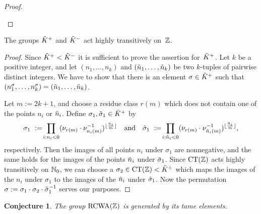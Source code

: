 \documentclass{amsart}
\theoremstyle{definition} \newtheorem{CTZDefinition}{Definition}[section]
\theoremstyle{plain}      \newtheorem{CTZPropertiesTheorem}[CTZDefinition]{Theorem}
\theoremstyle{plain}      \newtheorem{CTZSubgroupsTheorem}[CTZDefinition]{Theorem}
\theoremstyle{definition} \newtheorem{RcwaMappingDefinition}{Definition}[section]
\theoremstyle{definition} \newtheorem{RCWADefinition}[RcwaMappingDefinition]{Definition}
\theoremstyle{plain}      \newtheorem{CTZNotFinitelyGeneratedTheorem}
\theoremstyle{definition} \newtheorem{CTZSmEmbeddingDefinition}[RcwaMappingDefinition]{Definition}
\theoremstyle{plain}      \newtheorem{CTZHighlyTransitiveTheorem}[RcwaMappingDefinition]{Theorem}
\theoremstyle{plain}      \newtheorem{CTZTorsionElementsDivisibleTheorem}
\theoremstyle{plain}      \newtheorem{CTLemma}{Lemma}[section]
\theoremstyle{plain}      \newtheorem{IntegralCommutatorLemma}[CTLemma]{Lemma}
\theoremstyle{plain}      \newtheorem{NormalSubgroupContainsIntegralElementLemma}[CTLemma]{Lemma}
\theoremstyle{plain}      \newtheorem{CTZSimpleTheorem}[CTLemma]{Theorem}
\theoremstyle{remark}     \newtheorem{CTZSimpleRemark}[CTLemma]{Remark}
\theoremstyle{definition} \newtheorem{CTPZDefinition}[CTLemma]{Definition}
\theoremstyle{plain}      \newtheorem{CTPZSimpleCorollary}[CTLemma]{Corollary}
\theoremstyle{plain}      \newtheorem{CTPZSimpleProblem}[CTLemma]{Problem}
\theoremstyle{plain}      \newtheorem{FnPSL2ZEmbeddingTheorem}{Theorem}[section]
\theoremstyle{plain}      \newtheorem{FreeProductEmbeddingTheorem}[FnPSL2ZEmbeddingTheorem]{Theorem}
\theoremstyle{definition} \newtheorem{RestrictionMonomorphismDefinition}
\theoremstyle{plain}      \newtheorem{DirectAndWreathProductsEmbeddingTheorem}
\theoremstyle{plain}      \newtheorem{DirectAndWreathProductsEmbeddingCorollary}
\theoremstyle{definition} \newtheorem{CTintZDefinition}[FnPSL2ZEmbeddingTheorem]{Definition}
\theoremstyle{plain}      \newtheorem{CTintZSimpleTheorem}[FnPSL2ZEmbeddingTheorem]{Theorem}
\theoremstyle{definition} \newtheorem{KernelDefinition}{Definition}[section]
\theoremstyle{definition} \newtheorem{TameWildDefinition}[KernelDefinition]{Definition}
\theoremstyle{definition} \newtheorem{SimpleSupergroupsDefinition}[KernelDefinition]{Definition}
\theoremstyle{definition} \newtheorem{CSCRDefinition}[KernelDefinition]{Definition}
\theoremstyle{plain}      \newtheorem{SimpleSupergroupsGeneratorsTheorem}[KernelDefinition]{Theorem}
\theoremstyle{plain}      \newtheorem{SimpleSupergroupsTheorem}[KernelDefinition]{Theorem}
\theoremstyle{plain}      \newtheorem{SimpleSupergroupsTransitivityTheorem}
\theoremstyle{plain}      \newtheorem{TameGenerationConjecture}[KernelDefinition]{Conjecture}
\theoremstyle{remark}     \newtheorem{TameGenerationRemark}[KernelDefinition]{Remark}
\begin{document}
\begin{proof}
\begin{enumerate}
  \end{enumerate}
  \vspace{-5mm}
\end{proof}

\begin{SimpleSupergroupsTransitivityTheorem} \label{SimpleSupergroupsTransitivityTheorem}
  The groups \(\tilde{K}^+\) and \(\tilde{K}^-\) act highly transitively on~\(\mathbb{Z}\).
\end{SimpleSupergroupsTransitivityTheorem}
\begin{proof}
  Since \(\tilde{K}^+ < \tilde{K}^-\) it is sufficient to prove the assertion for~\(\tilde{K}^+\).
  Let \(k\) be a positive integer, and let \((n_1, \dots, n_k)\) and \((\tilde{n}_1, \dots, \tilde{n}_k)\)
  be two \(k\)-tuples of pairwise distinct integers.
  We have to show that there is an element \(\sigma \in \tilde{K}^+\) such that
  \((n_1^\sigma, \dots, n_k^\sigma) = (\tilde{n}_1, \dots, \tilde{n}_k)\).

  Let \(m := 2k+1\), and choose a residue class \(r(m)\) which does not contain one of the
  points \(n_i\) or \(\tilde{n}_i\). Define \(\sigma_1, \tilde{\sigma}_1 \in \tilde{K}^+\) by
  \[
    \sigma_1 \ := \!
    \prod_{i: n_i < 0} (\nu_{r(m)} \cdot \nu_{n_i(m)}^{-1})^{\lfloor \frac{n_i}{m} \rfloor}
    \ \ \ \text{and} \ \ \
    \tilde{\sigma}_1 \ := \!
    \prod_{i: \tilde{n}_i < 0}
    (\nu_{r(m)} \cdot \nu_{\tilde{n}_i(m)}^{-1})^{\lfloor \frac{\tilde{n}_i}{m} \rfloor},
  \]
  respectively.
  Then the images of all points \(n_i\) under \(\sigma_1\) are nonnegative,
  and the same holds for the images of the points \(\tilde{n}_i\) under \(\tilde{\sigma}_1\).
  Since \(\CT{\ZZ}\) acts highly transitively on \(\mathbb{N}_0\), we can choose
  a \(\sigma_2 \in \CT{\ZZ} < \ti{K}^+\) which maps the images of the \(n_i\) under
  \(\sigma_1\) to the images of the \(\tilde{n}_i\) under \(\tilde{\sigma}_1\). Now the
  permutation \(\sigma := \sigma_1 \cdot \sigma_2 \cdot \tilde{\sigma}_1^{-1}\) serves
  our purposes.
\end{proof}

\begin{TameGenerationConjecture} \label{TameGenerationConjecture}
  The group \(\RCWA{\ZZ}\) is generated by its tame elements.
\end{TameGenerationConjecture}
\end{document}

